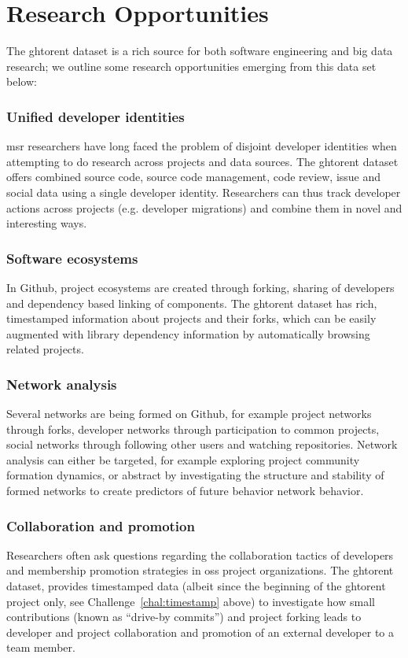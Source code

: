 \documentclass[conference]{IEEEtran}
\begin{document}
\section{Research Opportunities}

The {\sc ght}orent dataset is a rich source for both software engineering and
big data research; we outline some research opportunities emerging from
this data set below:

\subsubsection{Unified developer identities} {\sc msr} researchers have long
faced the
problem of disjoint developer identities when attempting to do research across
projects and data sources. The {\sc ght}orent dataset offers
combined source code, source code management, code review, issue and social
data using a single developer identity. Researchers can thus track developer
actions across projects (e.g. developer migrations) and combine them in 
novel and interesting ways. 

\subsubsection{Software ecosystems} In Github, project ecosystems are created
through forking, sharing of developers and dependency based linking of
components. The {\sc ght}orent dataset has rich, timestamped information about 
projects and their forks, which can be easily augmented with library
dependency information by automatically browsing related projects.

\subsubsection{Network analysis} Several networks are being formed on
Github, for example project networks through forks, developer networks
through participation to common projects, social networks through following
other users and watching repositories. Network analysis can either
be targeted, for example exploring project community formation dynamics, or
abstract by investigating the structure and stability of formed networks to
create predictors of future behavior network behavior.

\subsubsection{Collaboration and promotion} Researchers often ask questions
regarding the collaboration tactics of developers and membership promotion
strategies in {\sc oss} project organizations.  The {\sc ght}orent dataset,
provides timestamped data (albeit since the beginning of the {\sc ght}orent
project only, see Challenge~\ref{chal:timestamp} above) to investigate
how small contributions (known as ``drive-by commits'') and project
forking leads to developer and project collaboration and promotion of an
external developer to a team member.
\end{document}
